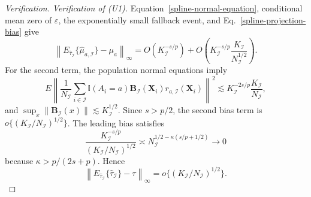 \documentclass[11pt]{article}
\theoremstyle{referenceplain}
\theoremstyle{referencedefinition}
\theoremstyle{referenceremark}
\begin{document}
\begin{proof}[Verification]
\medskip\noindent\textit{Verification of (U1).}
Equation~\eqref{spline-normal-equation}, conditional mean zero of $\varepsilon$, the exponentially small fallback event, and Eq.~\eqref{spline-projection-bias} give
\[
\left\|
E_{\widehat\tau_{\mathcal I}}
\{\widehat\mu_{a,\mathcal I}\}-\mu_a
\right\|_\infty
=O(K_{\mathcal I}^{-s/p})
+O\left(K_{\mathcal I}^{-s/p}
\frac{K_{\mathcal I}}{N_{\mathcal I}^{1/2}}\right).
\]
For the second term, the population normal equations imply
\[
E\left\|
\frac1{N_{\mathcal I}}
\sum_{i\in\mathcal I}\mathbb I(A_i=a)
\mathbf B_{\mathcal I}(\mathbf X_i)
r_{a,\mathcal I}(\mathbf X_i)
\right\|^2
\lesssim K_{\mathcal I}^{-2s/p}
\frac{K_{\mathcal I}}{N_{\mathcal I}},
\]
and $\sup_x\|\mathbf B_{\mathcal I}(x)\|\lesssim K_{\mathcal I}^{1/2}$. Since $s>p/2$,
the second bias term is $o\{(K_{\mathcal I}/N_{\mathcal I})^{1/2}\}$. The leading bias satisfies
\[
\frac{K_{\mathcal I}^{-s/p}}
{(K_{\mathcal I}/N_{\mathcal I})^{1/2}}
\asymp
N_{\mathcal I}^{1/2-\kappa(s/p+1/2)}
\longrightarrow0
\]
because $\kappa>p/(2s+p)$. Hence
\begin{equation}
\left\|
E_{\widehat\tau_{\mathcal I}}
\{\widehat\tau_{\mathcal I}\}-\tau
\right\|_\infty
=o\{(K_{\mathcal I}/N_{\mathcal I})^{1/2}\}.
\label{spline-strict-undersmoothing}
\end{equation}


\end{proof}
\end{document}
